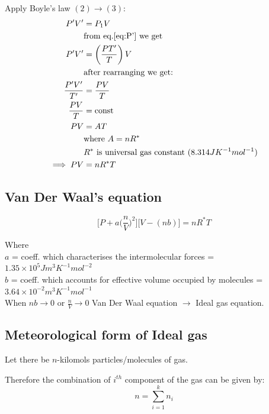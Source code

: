 \documentclass[fleqn,10pt]{SelfArx} %
\begin{document}
Apply Boyle's law $(2) \rightarrow (3)$:
\begin{equation}
\begin{aligned}
    P'V' &= P_1V \\
    &\text{from eq.\ref{eq:P'} we get} \\
    P'V' &= \left(\frac{PT'}{T}\right)V \\
    &\text{after rearranging we get:} \\
    \frac{P'V'}{T'} &= \frac{PV}{T} \\
    \frac{PV}{T} &= \text{const} \\
    PV &=AT \\ 
    &\text{where $A = nR^*$} \\
    &\text{$R^*$ is universal gas constant ($8.314JK^{-1}mol^{-1}$)} \\
    \implies PV&=nR^*T
\end{aligned}
\end{equation}

\subsection{Van Der Waal's equation}
\begin{equation}
    \Big[P+a\Big(\frac{n}{V}\Big)^2\Big]\Big[V-(nb)\Big]=nR^*T
\end{equation}

\noindent Where \\ $a$ = coeff. which characterises the intermolecular forces = $1.35 \times 10^5 Jm^3K^{-1}mol^{-2}$ \\ $b$ = coeff. which accounts for effective volume occupied by molecules = $3.64 \times 10^{-2} m^3 K^{-1}mol^{-1}$ \\
When $nb \rightarrow 0 \text{ or } \frac{n}{V} \rightarrow 0$ Van Der Waal equation $\rightarrow$ Ideal gas equation.

\subsection{Meteorological form of Ideal gas}
Let there be $n$-kilomols particles/molecules of gas.

Therefore the combination of $i^{th}$ component of the gas can be given by:
\begin{equation}
    n=\sum^k_{i=1}n_i
\end{equation}
\end{document}
